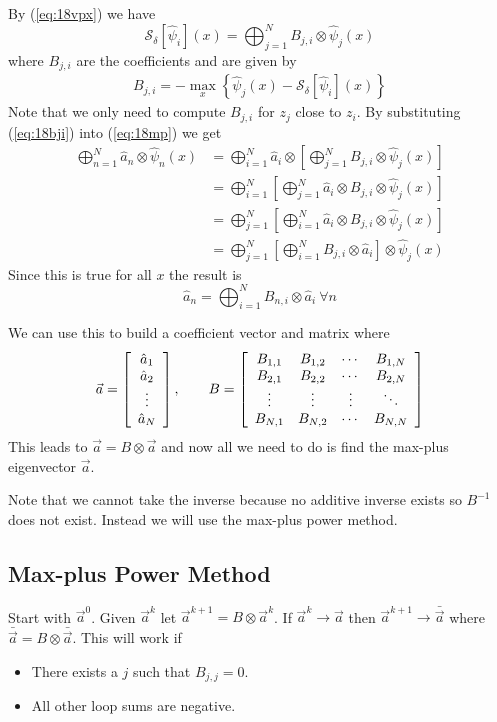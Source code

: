By (\ref{eq:18vpx}) we have
$$\mathcal{S}_\delta[\hat{\psi}_i](x) = \bigoplus_{j=1}^NB_{j,i}\otimes\hat{\psi}_j(x)$$
where $B_{j,i}$ are the coefficients and are given by
\begin{align}
\label{eq:18bji}
B_{j,i} = -\max_x\left\lbrace \hat{\psi}_j(x) - \mathcal{S}_\delta[\hat{\psi}_i](x) \right\rbrace
\end{align}
Note that we only need to compute $B_{j,i}$ for $z_j$ close to $z_i$. By substituting (\ref{eq:18bji}) into (\ref{eq:18mp}) we get
\begin{align*}
\bigoplus_{n=1}^N\hat{a}_n\otimes\hat{\psi}_n(x) &= \bigoplus_{i=1}^N\hat{a}_i\otimes\left[ \bigoplus_{j=1}^N B_{j,i}\otimes\hat{\psi}_j(x)\right] \\
&= \bigoplus_{i=1}^N\left[\bigoplus_{j=1}^N\hat{a}_i\otimes B_{j,i}\otimes \hat{\psi}_j(x)\right] \\
&= \bigoplus_{j=1}^N\left[\bigoplus_{i=1}^N\hat{a}_i\otimes B_{j,i}\otimes \hat{\psi}_j(x)\right] \\
&= \bigoplus_{j=1}^N\left[\bigoplus_{i=1}^NB_{j,i}\otimes\hat{a}_i\right] \otimes \hat{\psi}_j(x)
\end{align*}
Since this is true for all $x$ the result is
$$\hat{a}_n = \bigoplus_{i=1}^NB_{n,i}\otimes\hat{a}_i ~\forall n$$

We can use this to build a coefficient vector and matrix where
\begin{align*}
\vec{a} = \left[\begin{array}{c} \hat{a}_1 \\ \hat{a}_2 \\ \vdots \\ \hat{a}_N \end{array}\right], \qquad
B = \left[\begin{array}{c c c c} B_{1,1} & B_{1,2} & \cdots & B_{1,N} \\ B_{2,1} & B_{2,2} & \cdots & B_{2,N} \\ \vdots & \vdots & \vdots & \ddots \\ B_{N,1} & B_{N,2} & \cdots & B_{N,N} \end{array}\right]
\end{align*}
This leads to $\vec{a} = B\otimes\vec{a}$ and now all we need to do is find the max-plus eigenvector $\vec{a}$.

Note that we cannot take the inverse because no additive inverse exists so $B^{-1}$ does not exist. Instead we will use the max-plus power method.

\subsection{Max-plus Power Method}
Start with $\vec{a}^0$. Given $\vec{a}^k$ let $\vec{a}^{k+1}=B\otimes\vec{a}^k$. If $\vec{a}^k\to\vec{a}$ then $\vec{a}^{k+1}\to\bar{\vec{a}}$ where $\bar{\vec{a}}=B\otimes\bar{\vec{a}}$. This will work if
\begin{itemize}
\item There exists a $j$ such that $B_{j,j}=0$.
\item All other loop sums are negative.
\end{itemize}

